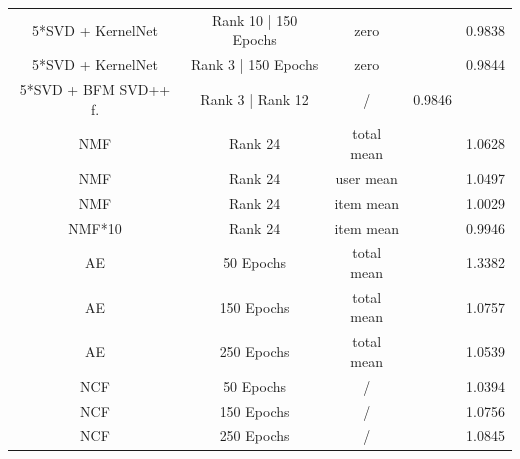 \documentclass[10pt,conference,compsocconf]{IEEEtran}
\begin{document}
\begin{table}
{\begin{tabular}{|| c | c | c | c | c ||}
                5*SVD + KernelNet    & Rank 10 | 150 Epochs                  & zero                    &                        & 0.9838                  \\
                5*SVD + KernelNet    & Rank 3 | 150 Epochs                   & zero                    &                        & 0.9844                  \\
                5*SVD + BFM SVD++ f. & Rank 3 | Rank 12                      & /                       & 0.9846                 &                         \\
                \hline
                NMF                  & Rank 24                               & total mean              &                        & 1.0628                  \\
                NMF                  & Rank 24                               & user mean               &                        & 1.0497                  \\
                NMF                  & Rank 24                               & item mean               &                        & 1.0029                  \\
                NMF*10               & Rank 24                               & item mean               &                        & 0.9946                  \\
                \hline
                AE                   & 50 Epochs                             & total mean              &                        & 1.3382                  \\
                AE                   & 150 Epochs                            & total mean              &                        & 1.0757                  \\
                AE                   & 250 Epochs                            & total mean              &                        & 1.0539                  \\
                \hline
                NCF                  & 50 Epochs                             & /                       &                        & 1.0394                  \\
                NCF                  & 150 Epochs                            & /                       &                        & 1.0756                 \\
                NCF                  & 250 Epochs                            & /                       &                        & 1.0845                  \\

\end{tabular}}
\end{table}
\end{document}
